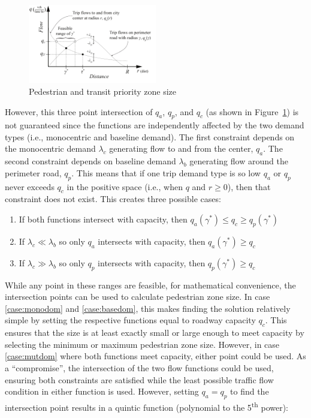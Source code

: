 \documentclass{elsarticle}\usepackage[]{graphicx}\usepackage[]{color}
\begin{document}
 \begin{figure}[H]
     \centering
     \includegraphics[width=0.5\textwidth]{diagram_flow_combo}
     \caption{Pedestrian and transit priority zone size}
     \label{fig:flowcombo}
 \end{figure}

However, this three point intersection of $q_a$, $q_p$, and $q_c$ (as shown in Figure~\ref{fig:flowcombo}) is not guaranteed since the functions are independently affected by the two demand types (i.e., monocentric and baseline demand). The first constraint depends on the monocentric demand $\lambda_c$ generating flow to and from the center, $q_a$. The second constraint depends on baseline demand $\lambda_b$ generating flow around the perimeter road, $q_p$. This means that if one trip demand type is so low $q_a$ or $q_p$ never exceeds $q_c$ in the positive space (i.e., when $q$ and $r \geq 0$), then that constraint does not exist. This creates three possible cases:

\begin{enumerate}[label=(\alph*)]
    \item If both functions intersect with capacity, then $q_a(\gamma^*) \leq q_c \geq q_p(\gamma^*)$ \label{case:mutdom}
    \item If $\lambda_c \ll \lambda_b$ so only $q_a$ intersects with capacity, then $q_a(\gamma^*) \geq q_c$ \label{case:monodom}
    \item If $\lambda_c \gg \lambda_b$ so only $q_p$ intersects with capacity, then $q_p(\gamma^*) \geq q_c$ \label{case:basedom}
\end{enumerate}

While any point in these ranges are feasible, for mathematical convenience, the intersection points can be used to calculate pedestrian zone size. In case \ref{case:monodom} and \ref{case:basedom}, this makes finding the solution relatively simple by setting the respective functions equal to roadway capacity $q_c$. This ensures that the size is at least exactly small or large enough to meet capacity by selecting the minimum or maximum pedestrian zone size. However, in case \ref{case:mutdom} where both functions meet capacity, either point could be used. As a ``compromise'', the intersection of the two flow functions could be used, ensuring both constraints are satisfied while the least possible traffic flow condition in either function is used. However, setting $q_a = q_p$ to find the intersection point results in a quintic function (polynomial to the 5\textsuperscript{th} power):
\end{document}

